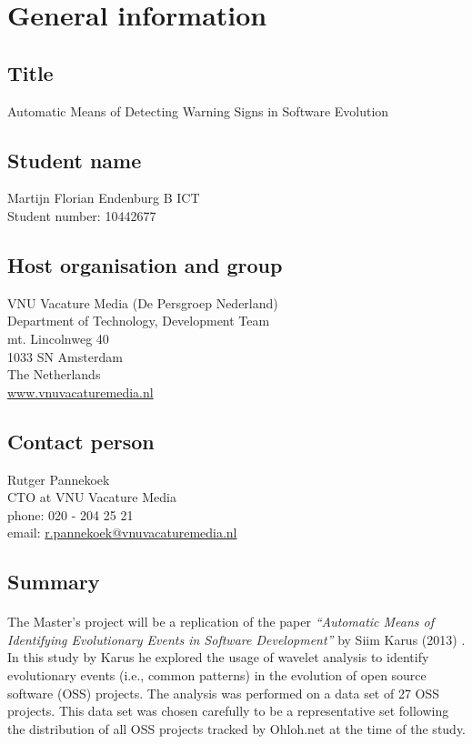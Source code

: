 \section{General information}
\subsection{Title}
Automatic Means of Detecting Warning Signs in Software Evolution

\subsection{Student name}
Martijn Florian Endenburg B ICT \\
Student number: 10442677

\subsection{Host organisation and group}
VNU Vacature Media (De Persgroep Nederland) \\
Department of Technology, Development Team \\
mt. Lincolnweg 40 \\
1033 SN Amsterdam \\
The Netherlands \\
\href{http://www.vnuvacaturemedia.nl}{www.vnuvacaturemedia.nl}

\subsection{Contact person}
Rutger Pannekoek \\
CTO at VNU Vacature Media \\
phone: 020 - 204 25 21 \\
email:
\href{mailto:r.pannekoek@vnuvacaturemedia.nl}{r.pannekoek@vnuvacaturemedia.nl}

\subsection{Summary}
\paragraph{}
The Master's project will be a replication of the paper \emph{``Automatic Means
of Identifying Evolutionary Events in Software Development''} by Siim Karus
(2013) \cite{karus2013}. In this study by Karus he explored the usage of wavelet
analysis to identify evolutionary events (i.e., common patterns) in the
evolution of open source software (OSS) projects. The analysis was performed on
a data set of 27 OSS projects. This data set was chosen carefully to be a
representative set following the distribution of all OSS projects tracked by
Ohloh.net at the time of the study.
\\

